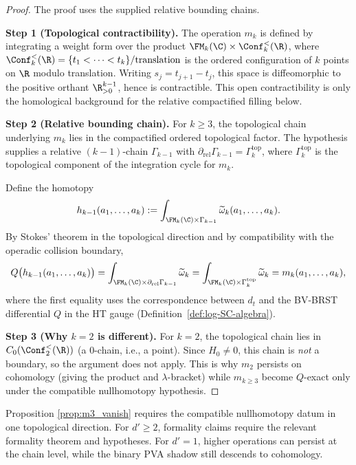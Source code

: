 \begin{proof}
The proof uses the supplied relative bounding chains.

\textbf{Step 1 (Topological contractibility).}
The operation $m_k$ is defined by integrating a weight form over the
product $\FM_k(\C) \times \Conf_k^{<}(\R)$, where
$\Conf_k^{<}(\R) = \{t_1 < \cdots < t_k\}/\text{translation}$
is the ordered configuration of $k$ points on $\R$ modulo translation.
Writing \(s_j=t_{j+1}-t_j\), this space is diffeomorphic to the
positive orthant \(\R^{k-1}_{>0}\), hence is contractible.  This open
contractibility is only the homological background for the relative
compactified filling below.

\textbf{Step 2 (Relative bounding chain).}
For $k \geq 3$, the topological chain underlying $m_k$ lies in the
compactified ordered topological factor. The hypothesis
supplies a relative $(k{-}1)$-chain $\Gamma_{k-1}$ with
$\partial_{\mathrm{rel}} \Gamma_{k-1} = \Gamma_k^{\mathrm{top}}$, where
$\Gamma_k^{\mathrm{top}}$ is the topological component of the
integration cycle for $m_k$.

Define the homotopy
\[
h_{k-1}(a_1,\ldots,a_k) := \int_{\FM_k(\C) \times \Gamma_{k-1}}
\widetilde{\omega}_k(a_1,\ldots,a_k).
\]
By Stokes' theorem in the topological direction and by compatibility
with the operadic collision boundary,
\[
Q\bigl(h_{k-1}(a_1,\ldots,a_k)\bigr)
= \int_{\FM_k(\C) \times \partial_{\mathrm{rel}}\Gamma_{k-1}} \widetilde{\omega}_k
= \int_{\FM_k(\C) \times \Gamma_k^{\mathrm{top}}} \widetilde{\omega}_k
= m_k(a_1,\ldots,a_k),
\]
where the first equality uses the correspondence between $d_t$ and the
BV-BRST differential $Q$ in the HT gauge
(Definition~\ref{def:log-SC-algebra}).

\textbf{Step 3 (Why $k=2$ is different).}
For $k=2$, the topological chain lies in $C_0(\Conf_2^{<}(\R))$
(a $0$-chain, i.e., a point). Since $H_0 \neq 0$, this chain is
\emph{not} a boundary, so the argument does not apply. This is why
$m_2$ persists on cohomology (giving the product and $\lambda$-bracket)
while $m_{k \geq 3}$ become $Q$-exact only under the compatible
nullhomotopy hypothesis.
\end{proof}

\begin{remark}[The Role of $d'=1$]
Proposition \ref{prop:m3_vanish} requires the compatible
nullhomotopy datum in one topological direction. For $d' \geq 2$,
formality claims require the relevant formality theorem and
hypotheses. For $d'=1$, higher operations can persist at the chain
level, while the binary PVA shadow still descends to cohomology.
\end{remark}


